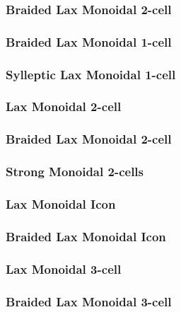 






\subsubsection*{Braided Lax Monoidal 2-cell}


\subsubsection*{Braided Lax Monoidal 1-cell}


\subsubsection*{Sylleptic Lax Monoidal 1-cell} \newpage


\subsubsection*{Lax Monoidal 2-cell}

  \newpage

 \newpage

 \newpage

\subsubsection*{Braided Lax Monoidal 2-cell}

 \newpage


\subsubsection*{Strong Monoidal 2-cells}




\newpage
\subsubsection*{Lax Monoidal Icon}

\newpage

\newpage

\newpage


\subsubsection*{Braided Lax Monoidal Icon}

\newpage

\subsubsection*{Lax Monoidal 3-cell}

\subsubsection*{Braided Lax Monoidal 3-cell}